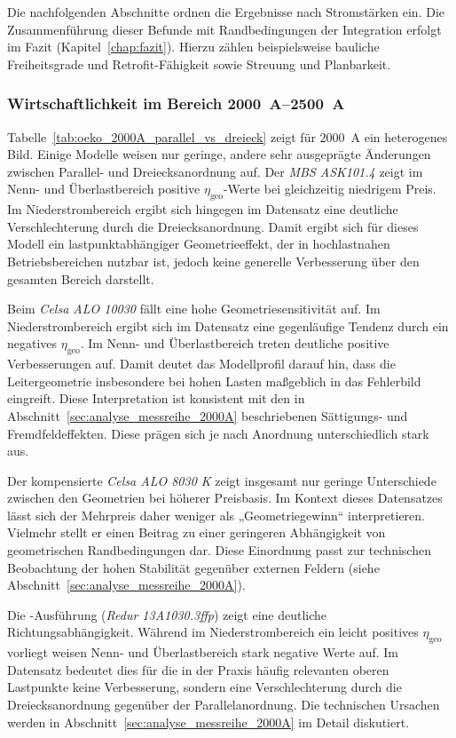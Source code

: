 Die nachfolgenden Abschnitte ordnen die Ergebnisse nach Stromstärken ein. Die Zusammenführung dieser Befunde mit Randbedingungen der Integration erfolgt im Fazit (Kapitel~\ref{chap:fazit}). Hierzu zählen beispielsweise bauliche Freiheitsgrade und Retrofit-Fähigkeit sowie Streuung und Planbarkeit.

\subsubsection{Wirtschaftlichkeit im Bereich \SIrange{2000}{2500}{A}}

Tabelle~\ref{tab:oeko_2000A_parallel_vs_dreieck} zeigt für \SI{2000}{A} ein heterogenes Bild. Einige Modelle weisen nur geringe, andere sehr ausgeprägte Änderungen zwischen Parallel- und Dreiecksanordnung auf. Der \textit{MBS ASK101.4} zeigt im Nenn- und Überlastbereich positive \(\eta_{\text{geo}}\)-Werte bei gleichzeitig niedrigem Preis. Im Niederstrombereich ergibt sich hingegen im Datensatz eine deutliche Verschlechterung durch die Dreiecksanordnung. Damit ergibt sich für dieses Modell ein lastpunktabhängiger Geometrieeffekt, der in hochlastnahen Betriebsbereichen nutzbar ist, jedoch keine generelle Verbesserung über den gesamten Bereich darstellt.

Beim \textit{Celsa ALO 10030} fällt eine hohe Geometriesensitivität auf. Im Niederstrombereich ergibt sich im Datensatz eine gegenläufige Tendenz durch ein negatives \(\eta_{\text{geo}}\). Im Nenn- und Überlastbereich treten deutliche positive Verbesserungen auf. Damit deutet das Modellprofil darauf hin, dass die Leitergeometrie insbesondere bei hohen Lasten maßgeblich in das Fehlerbild eingreift. Diese Interpretation ist konsistent mit den in Abschnitt~\ref{sec:analyse_messreihe_2000A} beschriebenen Sättigungs- und Fremdfeldeffekten. Diese prägen sich je nach Anordnung unterschiedlich stark aus.

Der kompensierte \textit{Celsa ALO 8030 K} zeigt insgesamt nur geringe Unterschiede zwischen den Geometrien bei höherer Preisbasis. Im Kontext dieses Datensatzes lässt sich der Mehrpreis daher weniger als „Geometriegewinn“ interpretieren. Vielmehr stellt er einen Beitrag zu einer geringeren Abhängigkeit von geometrischen Randbedingungen dar. Diese Einordnung passt zur technischen Beobachtung der hohen Stabilität gegenüber externen Feldern (siehe Abschnitt~\ref{sec:analyse_messreihe_2000A}).

Die -Ausführung (\textit{Redur 13A1030.3ffp}) zeigt eine deutliche Richtungsabhängigkeit. Während im Niederstrombereich ein leicht positives \(\eta_{\text{geo}}\) vorliegt weisen Nenn- und Überlastbereich stark negative Werte auf. Im Datensatz bedeutet dies für die in der Praxis häufig relevanten oberen Lastpunkte keine Verbesserung, sondern eine Verschlechterung durch die Dreiecksanordnung gegenüber der Parallelanordnung. Die technischen Ursachen werden in Abschnitt~\ref{sec:analyse_messreihe_2000A} im Detail diskutiert.

